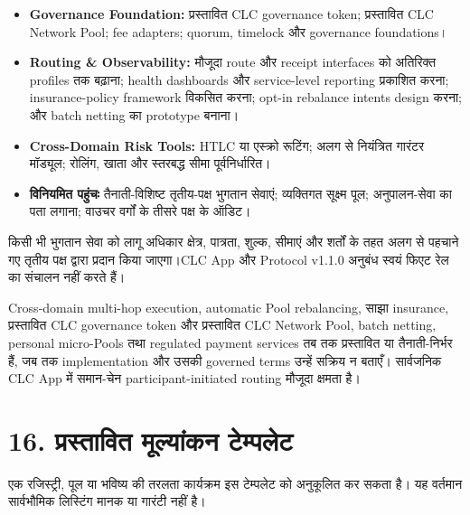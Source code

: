 \documentclass[11pt]{article}
\begin{document}
\begin{itemize}[leftmargin=*]
\item \textbf{Governance Foundation:} प्रस्तावित CLC governance token; प्रस्तावित CLC Network Pool; fee adapters; quorum, timelock और governance foundations।
\item \textbf{Routing \& Observability:} मौजूदा route और receipt interfaces को अतिरिक्त profiles तक बढ़ाना; health dashboards और service-level reporting प्रकाशित करना; insurance-policy framework विकसित करना; opt-in rebalance intents design करना; और batch netting का prototype बनाना।
\item \textbf{Cross-Domain Risk Tools:} HTLC या एस्क्रो रूटिंग; अलग से नियंत्रित गारंटर मॉड्यूल; रोलिंग, खाता और स्तरबद्ध सीमा पूर्वनिर्धारित।
\item \textbf{विनियमित पहुंचः} तैनाती-विशिष्ट तृतीय-पक्ष भुगतान सेवाएं; व्यक्तिगत सूक्ष्म पूल; अनुपालन-सेवा का पता लगाना; वाउचर वर्गों के तीसरे पक्ष के ऑडिट।
\end{itemize}
किसी भी भुगतान सेवा को लागू अधिकार क्षेत्र, पात्रता, शुल्क, सीमाएं और शर्तों के तहत अलग से पहचाने गए तृतीय पक्ष द्वारा प्रदान किया जाएगा।CLC App और Protocol v1.1.0 अनुबंध स्वयं फिएट रेल का संचालन नहीं करते हैं।

Cross-domain multi-hop execution, automatic Pool rebalancing, साझा insurance, प्रस्तावित CLC governance token और प्रस्तावित CLC Network Pool, batch netting, personal micro-Pools तथा regulated payment services तब तक प्रस्तावित या तैनाती-निर्भर हैं, जब तक implementation और उसकी governed terms उन्हें सक्रिय न बताएँ। सार्वजनिक CLC App में समान-चेन participant-initiated routing मौजूदा क्षमता है।


\section*{16. प्रस्तावित मूल्यांकन टेम्पलेट}

एक रजिस्ट्री, पूल या भविष्य की तरलता कार्यक्रम इस टेम्पलेट को अनुकूलित कर सकता है। यह वर्तमान सार्वभौमिक लिस्टिंग मानक या गारंटी नहीं है।
\end{document}
